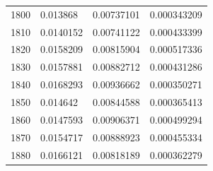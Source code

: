 \begin{center}
\begin{longtable}{l|l|l|l}
1800                                                   & 0.013868                                                          & 0.00737101                                               & 0.000343209                                                        \\
1810                                                   & 0.0140152                                                         & 0.00741122                                               & 0.000433399                                                        \\
1820                                                   & 0.0158209                                                         & 0.00815904                                               & 0.000517336                                                        \\
1830                                                   & 0.0157881                                                         & 0.00882712                                               & 0.000431286                                                        \\
1840                                                   & 0.0168293                                                         & 0.00936662                                               & 0.000350271                                                        \\
1850                                                   & 0.014642                                                          & 0.00844588                                               & 0.000365413                                                        \\
1860                                                   & 0.0147593                                                         & 0.00906371                                               & 0.000499294                                                        \\
1870                                                   & 0.0154717                                                         & 0.00888923                                               & 0.000455334                                                        \\
1880                                                   & 0.0166121                                                         & 0.00818189                                               & 0.000362279                                                        \\

\end{longtable}
\end{center}
